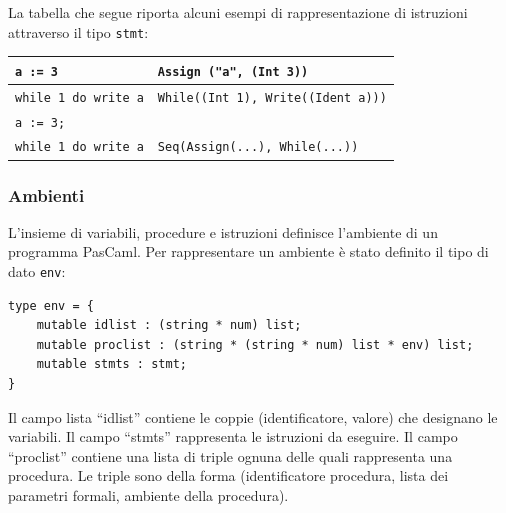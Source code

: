 \documentclass[a4paper,10pt]{article}
\begin{document}
La tabella che segue riporta alcuni esempi di
rappresentazione di istruzioni attraverso il tipo \verb|stmt|:

\begin{center}
\begin{tabular}{|l|l|}
\hline
\verb|a := 3| & \verb|Assign ("a", (Int 3))| \\
\hline
\verb|while 1 do write a| &
 \verb|While((Int 1), Write((Ident a)))| \\
\hline
\verb|a := 3;|\\ \verb|while 1 do write a| &
 \verb|Seq(Assign(...), While(...))|\\
\hline
\end{tabular} 
\end{center}

\subsubsection{Ambienti}
L'insieme di variabili, procedure e istruzioni definisce l'ambiente di un
programma PasCaml. Per rappresentare un ambiente \`e stato definito il tipo di
dato \verb|env|:
\begin{verbatim}
type env = {
    mutable idlist : (string * num) list;
    mutable proclist : (string * (string * num) list * env) list;
    mutable stmts : stmt;
}
\end{verbatim}
Il campo lista ``idlist'' contiene le coppie (identificatore, valore) che
designano le
variabili. Il campo ``stmts'' rappresenta le istruzioni da eseguire. Il campo
``proclist'' contiene una lista di triple ognuna delle quali rappresenta una
procedura. Le triple sono della forma (identificatore procedura, lista dei
parametri formali, ambiente della procedura).
\end{document}
